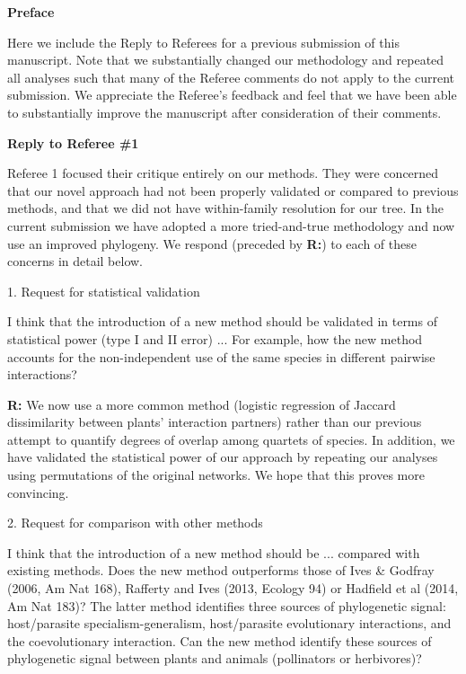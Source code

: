 \documentclass[12pt]{letter}
\newenvironment{refquote}{\bigskip \begin{it}}{\end{it}\smallskip}
\begin{document}
\newpage

\setcounter{page}{1}

{\Large \bf Preface}

Here we include the Reply to Referees for a previous submission of this manuscript. Note that we substantially changed our methodology and repeated all analyses such that many of the Referee comments do not apply to the current submission. We appreciate the Referee's feedback and feel that we have been able to substantially improve the manuscript after consideration of their comments.


\clearpage




{\Large \bf Reply to Referee \#1}


  Referee 1 focused their critique entirely on our methods. They were concerned that our novel approach had not been properly validated or compared to previous methods, and that we did not have within-family resolution for our tree. In the current submission we have adopted a more tried-and-true methodology and now use an improved phylogeny. We respond (preceded by \textbf{R:}) to each of these concerns in detail below.

  1. Request for statistical validation

    \begin{refquote}  

      I think that the introduction of a new method should be validated in terms of statistical power (type I and II error) ... For example, how the new method accounts for the non-independent use of the same species in different pairwise interactions?

    \end{refquote}

    \textbf{R:} We now use a more common method (logistic regression of Jaccard dissimilarity between plants' interaction partners) rather than our previous attempt to quantify degrees of overlap among quartets of species. In addition, we have validated the statistical power of our approach by repeating our analyses using permutations of the original networks. We hope that this proves more convincing.


  2. Request for comparison with other methods

    \begin{refquote}

      I think that the introduction of a new method should be ... compared with existing methods.  Does the new method outperforms  those of Ives \& Godfray (2006, Am Nat 168),  Rafferty and Ives (2013, Ecology 94) or Hadfield et al (2014, Am Nat 183)? The latter method identifies three sources of phylogenetic signal: host/parasite specialism-generalism, host/parasite evolutionary interactions, and the coevolutionary interaction. Can the new method identify these sources of phylogenetic signal between plants and animals (pollinators or herbivores)?

    \end{refquote}
\end{document}
